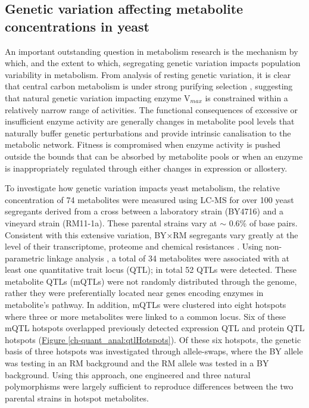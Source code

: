 \subsection{Genetic variation affecting metabolite concentrations in yeast}

An important outstanding question in metabolism research is the mechanism by which, and the extent to which, segregating genetic variation impacts population variability in metabolism.  From analysis of resting genetic variation, it is clear that central carbon metabolism is under strong purifying selection \cite{Greenberg:2008uy}, suggesting that natural genetic variation impacting enzyme V$_{max}$ is constrained within a relatively narrow range of activities. The functional consequences of excessive or insufficient enzyme activity are generally changes in metabolite pool levels that naturally buffer genetic perturbations \cite{Fendt:2010gr} and provide intrinsic canalisation to the metabolic network. Fitness is compromised when enzyme activity is pushed outside the bounds that can be absorbed by metabolite pools or when an enzyme is inappropriately regulated through either changes in expression or allostery. 

To investigate how genetic variation impacts yeast metabolism, the relative concentration of 74 metabolites were measured using LC-MS for over 100 yeast segregants derived from a cross between a laboratory strain (BY4716) and a vineyard strain (RM11-1a). These parental strains vary at $\sim$ 0.6\% of base pairs. Consistent with this extensive variation, BY$\times$RM segregants vary greatly at the level of their transcriptome, proteome and chemical resistances \cite{Brem:2005gh, Foss:2007ej, Bloom:2013bq}. Using non-parametric linkage analysis \cite{Broman:2003wq}, a total of 34 metabolites were associated with at least one quantitative trait locus (QTL); in total 52 QTLs were detected.  These metabolite QTLs (mQTLs) were not randomly distributed through the genome, rather they were preferentially located near genes encoding enzymes in metabolite's pathway. In addition, mQTLs were clustered into eight hotspots where three or more metabolites were linked to a common locus. Six of these mQTL hotspots overlapped previously detected expression QTL and protein QTL hotspots (\hyperref[ch-quant_anal:qtlHotspots]{Figure \ref{ch-quant_anal:qtlHotspots}}). Of these six hotspots, the genetic basis of three hotspots was investigated through allele-swaps, where the BY allele was testing in an RM background and the RM allele was tested in a BY background. Using this approach, one engineered and three natural polymorphisms were largely sufficient to reproduce differences between the two parental strains in hotspot metabolites. 

